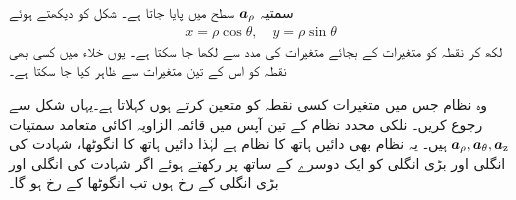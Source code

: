 سمتیہ ${\boldsymbol{a}}_{\rho}$ سطح  میں پایا جاتا ہے۔ شکل  کو دیکھتے ہوئے
\begin{align*}
x=\rho \cos \theta,\quad y=\rho \sin \theta
\end{align*}
لکھ کر نقطہ  کو متغیرات  کے بجائے متغیرات  کی مدد سے  لکھا جا سکتا ہے۔ یوں خلاء میں کسی بھی نقطہ کو اس کے تین متغیرات  سے ظاہر کیا جا سکتا ہے۔

وہ نظام جس میں متغیرات   کسی نقطہ کو متعین کرتے  ہوں   کہلاتا ہے۔یہاں شکل   سے رجوع کریں۔ نلکی محدد نظام کے تین آپس میں  قائمہ الزاویہ اکائی  متعامد سمتیات ${\boldsymbol{a}}_{\rho},{\boldsymbol{a}}_{\theta},{\boldsymbol{a}}_{\textup{z}}$ ہیں۔ یہ نظام بھی دائیں ہاتھ کا نظام ہے لہٰذا دائیں ہاتھ کا انگوٹھا، شہادت کی انگلی اور  بڑی انگلی کو ایک دوسرے کے ساتھ  پر رکھتے ہوئے اگر  شہادت کی انگلی  اور بڑی انگلی  کے رخ ہوں تب انگوٹھا  کے رخ ہو گا۔ 

